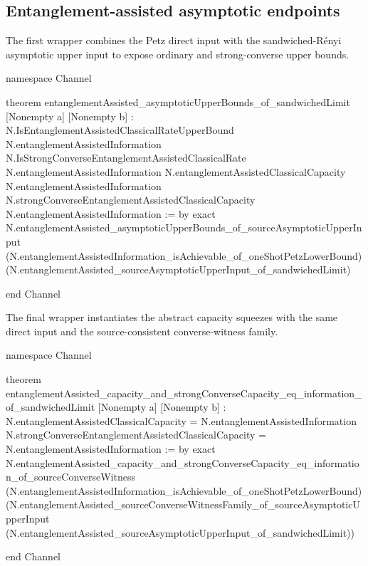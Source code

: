 \documentclass[10pt,a4paper]{article}
\begin{document}
	\subsection{Entanglement-assisted asymptotic endpoints}
	
	The first wrapper combines the Petz direct input with the sandwiched-R\'enyi
	asymptotic upper input to expose ordinary and strong-converse upper bounds.
	
\begin{qitleancode}[title={EA asymptotic upper endpoint}]
namespace Channel

theorem entanglementAssisted_asymptoticUpperBounds_of_sandwichedLimit
    [Nonempty a] [Nonempty b] :
    N.IsEntanglementAssistedClassicalRateUpperBound
        N.entanglementAssistedInformation \wedge
      N.IsStrongConverseEntanglementAssistedClassicalRate
        N.entanglementAssistedInformation \wedge
      N.entanglementAssistedClassicalCapacity \le
        N.entanglementAssistedInformation \wedge
      N.strongConverseEntanglementAssistedClassicalCapacity \le
        N.entanglementAssistedInformation := by
  exact N.entanglementAssisted_asymptoticUpperBounds_of_sourceAsymptoticUpperInput
    (N.entanglementAssistedInformation_isAchievable_of_oneShotPetzLowerBound)
    (N.entanglementAssisted_sourceAsymptoticUpperInput_of_sandwichedLimit)

end Channel
\end{qitleancode}
	
	The final wrapper instantiates the abstract capacity squeezes with the same
	direct input and the source-consistent converse-witness family.
	
\begin{qitleancode}[title={EA capacity and strong-converse endpoint}]
namespace Channel

theorem entanglementAssisted_capacity_and_strongConverseCapacity_eq_information_of_sandwichedLimit
    [Nonempty a] [Nonempty b] :
    N.entanglementAssistedClassicalCapacity = N.entanglementAssistedInformation \wedge
      N.strongConverseEntanglementAssistedClassicalCapacity =
        N.entanglementAssistedInformation := by
  exact
    N.entanglementAssisted_capacity_and_strongConverseCapacity_eq_information_of_sourceConverseWitness
      (N.entanglementAssistedInformation_isAchievable_of_oneShotPetzLowerBound)
      (N.entanglementAssisted_sourceConverseWitnessFamily_of_sourceAsymptoticUpperInput
        (N.entanglementAssisted_sourceAsymptoticUpperInput_of_sandwichedLimit))

end Channel
\end{qitleancode}
	
	\clearpage
	
	
	
\end{document}

